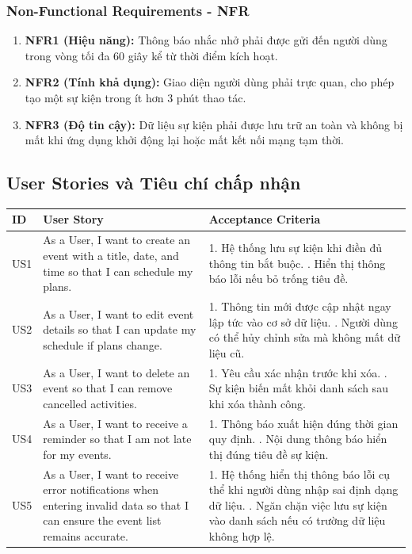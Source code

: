 \subsubsection{Non-Functional Requirements - NFR}
\begin{enumerate}
    \item \textbf{NFR1 (Hiệu năng):} Thông báo nhắc nhở phải được gửi đến người dùng trong vòng tối đa 60 giây kể từ thời điểm kích hoạt.
    \item \textbf{NFR2 (Tính khả dụng):} Giao diện người dùng phải trực quan, cho phép tạo một sự kiện trong ít hơn 3 phút thao tác.
    \item \textbf{NFR3 (Độ tin cậy):} Dữ liệu sự kiện phải được lưu trữ an toàn và không bị mất khi ứng dụng khởi động lại hoặc mất kết nối mạng tạm thời.
\end{enumerate}

\subsection{User Stories và Tiêu chí chấp nhận}

\begin{longtable}{|p{1cm}|p{6cm}|p{7cm}|}
\hline
\textbf{ID} & \textbf{User Story} & \textbf{Acceptance Criteria} \\ \hline
US1 & As a User, I want to create an event with a title, date, and time so that I can schedule my plans. & 1. Hệ thống lưu sự kiện khi điền đủ thông tin bắt buộc. \newline 2. Hiển thị thông báo lỗi nếu bỏ trống tiêu đề. \\ \hline
US2 & As a User, I want to edit event details so that I can update my schedule if plans change. & 1. Thông tin mới được cập nhật ngay lập tức vào cơ sở dữ liệu. \newline 2. Người dùng có thể hủy chỉnh sửa mà không mất dữ liệu cũ. \\ \hline
US3 & As a User, I want to delete an event so that I can remove cancelled activities. & 1. Yêu cầu xác nhận trước khi xóa. \newline 2. Sự kiện biến mất khỏi danh sách sau khi xóa thành công. \\ \hline
US4 & As a User, I want to receive a reminder so that I am not late for my events. & 1. Thông báo xuất hiện đúng thời gian quy định. \newline 2. Nội dung thông báo hiển thị đúng tiêu đề sự kiện. \\ \hline
US5 & As a User, I want to receive error notifications when entering invalid data so that I can ensure the event list remains accurate. & 1. Hệ thống hiển thị thông báo lỗi cụ thể khi người dùng nhập sai định dạng dữ liệu. \newline 2. Ngăn chặn việc lưu sự kiện vào danh sách nếu có trường dữ liệu không hợp lệ. \\ \hline
\end{longtable}

